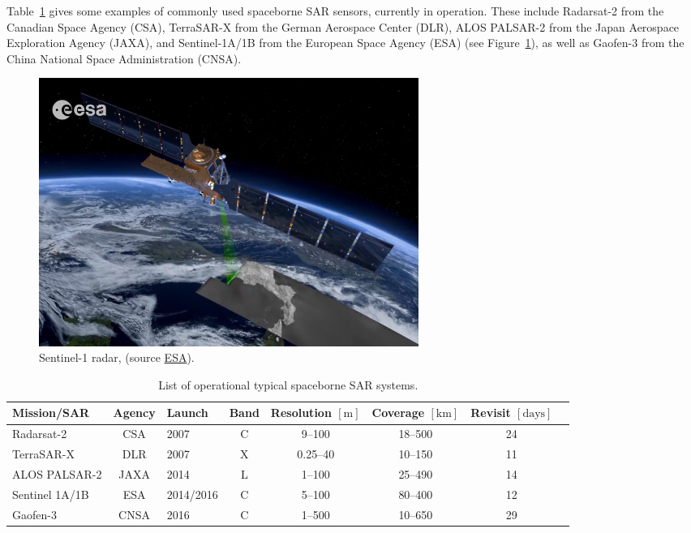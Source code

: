 	

Table~\ref{tab:spacebornes} gives some examples of commonly used spaceborne SAR sensors, currently in operation. 
These include Radarsat-2 from the Canadian Space Agency (CSA), TerraSAR-X from the German Aerospace Center (DLR), ALOS PALSAR-2 from the Japan Aerospace Exploration Agency (JAXA), and Sentinel-1A/1B from the European Space Agency (ESA) (see Figure~\ref{fig:Sentinel-1n}), as well as Gaofen-3 from the China National Space Administration (CNSA).
\begin{figure}[H]
    \centering
    \includegraphics[width=0.6\textwidth]{../../Images/PNG/ESA_radar.png}
    \caption[Sentinel-1 radar.]{Sentinel-1 radar, (source \href{https://www.esa.int/Applications/Observing_the_Earth/Copernicus/Sentinel-1/Changing_lands}{ESA}).}
    \label{fig:Sentinel-1n}
\end{figure}


\setlength{\tabcolsep}{3.0pt}
\begin{table}[!htb]
\caption[List of operational typical spaceborne SAR systems]{\label{tab:spacebornes}List of operational typical spaceborne SAR systems.}
\centering
\setlength{\extrarowheight}{3.0pt} %
\begin{tabular}[t]{lclccccc}
\toprule
\textbf{Mission/SAR} & \textbf{Agency} & \textbf{Launch} & \textbf{Band} & \textbf{Resolution} $\left[\text{m}\right]$ & \textbf{Coverage} $\left[\text{km}\right]$ & \textbf{Revisit} $\left[\text{days}\right]$ \\
\midrule
Radarsat-2 & CSA & 2007 & C & 9--100 & 18--500 & 24 \\
TerraSAR-X & DLR & 2007 & X & 0.25--40 & 10--150 & 11 \\
ALOS PALSAR-2 & JAXA & 2014 & L & 1--100 & 25--490 & 14 \\
Sentinel 1A/1B & ESA & 2014/2016 & C & 5--100 & 80--400 & 12 \\
Gaofen-3 & CNSA & 2016 & C & 1--500 & 10--650 & 29 \\
\bottomrule
\end{tabular}
\end{table}

